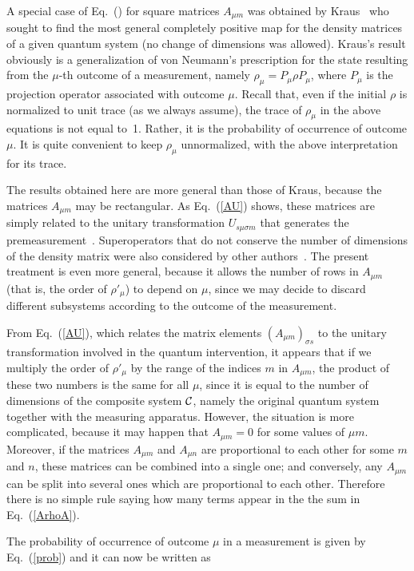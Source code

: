 \documentclass[12pt]{article}
\def\Eq{Eq.~(\ref}
\def\cC{$\cal C$}
\begin{document}
A special case of Eq.~(\theequation) for square matrices $A_{\mu m}$
was obtained by Kraus~\cite{Kraus} who sought to find the most general
completely positive map for the density matrices of a given quantum
system (no change of dimensions was allowed). Kraus's result obviously
is a generalization of von Neumann's prescription for the state
resulting from the $\mu$-th outcome of a measurement, namely
$\rho_\mu=P_\mu\rho P_\mu$, where $P_\mu$ is the projection operator
associated with outcome $\mu$. Recall that, even if the initial $\rho$
is normalized to unit trace (as we always assume), the trace of
$\rho_\mu$ in the above equations is not equal to~1. Rather, it is the
probability of occurrence of outcome $\mu$. It is quite convenient to
keep $\rho_\mu$ unnormalized, with the above interpretation for its
trace.

The results obtained here are more general than those of Kraus, because
the matrices $A_{\mu m}$ may be rectangular. As \Eq{AU}) shows, these
matrices are simply related to the unitary transformation $U_{s\mu\sigma
m}$ that generates the premeasurement~\cite{ben}. Super\-operators that
do not conserve the number of dimensions of the density matrix were also
considered by other authors~\cite{Ben}. The present treatment is even
more general, because it allows the number of rows in $A_{\mu m}$ (that
is, the order of $\rho'_\mu$) to depend on $\mu$, since we may decide to
discard different subsystems according to the outcome of the
measurement. 

{}From \Eq{AU}), which relates the matrix elements $(A_{\mu m})_{\sigma
s}$ to the unitary transformation involved in the quantum intervention,
it appears that if we multiply the order of $\rho'_\mu$ by the range
of the indices $m$ in $A_{\mu m}$, the product of these two numbers is
the same for all $\mu$, since it is equal to the number of dimensions of
the composite system \cC, namely the original quantum system together
with the measuring apparatus. However, the situation is more
complicated, because it may happen that $A_{\mu m}=0$ for some values of
$\mu m$. Moreover, if the matrices $A_{\mu m}$ and $A_{\mu n}$ are
proportional to each other for some $m$ and $n$, these matrices can be
combined into a single one; and conversely, any $A_{\mu m}$ can be split
into several ones which are proportional to each other. Therefore there
is no simple rule saying how many terms appear in the the sum in
\Eq{ArhoA}).

The probability of occurrence of outcome $\mu$ in a measurement is given
by \Eq{prob}) and it can now be written as
\end{document}
